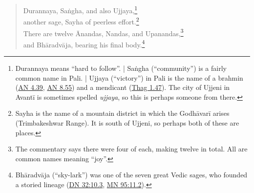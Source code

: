 \documentclass[12pt,openany]{book}%
\begin{document}
\begin{verse}
Durannaya, \textsanskrit{Saṅgha}, and also Ujjaya,\footnote{Durannaya means “hard to follow”. | \textsanskrit{Saṅgha} (“community”) is a fairly common name in Pali. | Ujjaya (“victory”) in Pali is the name of a brahmin (\href{https://suttacentral.net/an4.39/en/sujato}{AN 4.39}, \href{https://suttacentral.net/an8.55/en/sujato}{AN 8.55}) and a mendicant (\href{https://suttacentral.net/thag1.47/en/sujato}{Thag 1.47}). The city of Ujjeni in \textsanskrit{Avantī} is sometimes spelled \textit{ujjaya}, so this is perhaps someone from there. } \\
another sage, Sayha of peerless effort.\footnote{Sayha is the name of a mountain district in which the \textsanskrit{Godhāvarī} arises (Trimbakeshwar Range). It is south of Ujjeni, so perhaps both of these are places. } \\
There are twelve Ānandas, Nandas, and Upanandas,\footnote{The commentary says there were four of each, making twelve in total. All are common names meaning “joy”. } \\
and \textsanskrit{Bhāradvāja}, bearing his final body.\footnote{\textsanskrit{Bhāradvāja} (“sky-lark”) was one of the seven great Vedic sages, who founded a storied lineage (\href{https://suttacentral.net/dn32/en/sujato\#10.3}{DN 32:10.3}, \href{https://suttacentral.net/mn95/en/sujato\#11.2}{MN 95:11.2}). } 


\end{verse}
\end{document}
